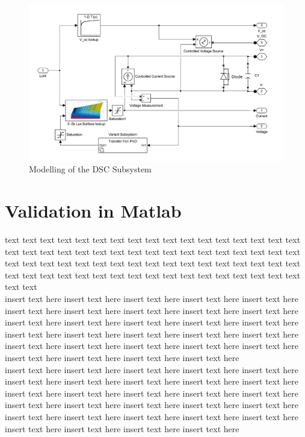 \begin{figure}[H]
  \begin{center}
  \includegraphics[width=\textwidth]{images/PV_block_Model}
  \caption{Modelling of the DSC Subsystem }
  \label{fig:PV_block_Model}
  \end{center}
  \end{figure}





\section {Validation in Matlab{\textregistered}}

text text text text text text text text text text text text text text text text text text text text text text text text text text text text text text text text text text text text text text text text text text text text text text text text text text text text text text text text text text text text text text text text text text text text text text  \\

insert text here insert text here insert text here insert text here insert text here
insert text here insert text here insert text here insert text here insert text here insert text here insert text here insert text here insert text here insert text here insert text here insert text here insert text here insert text here insert text here insert text here insert text here insert text here insert text here insert text here insert text here insert text here insert text here insert text here   \\

insert text here insert text here insert text here insert text here insert text here
insert text here insert text here insert text here insert text here insert text here insert text here insert text here insert text here insert text here insert text here insert text here insert text here insert text here insert text here insert text here insert text here insert text here insert text here insert text here insert text here insert text here insert text here insert text here insert text here   \\
